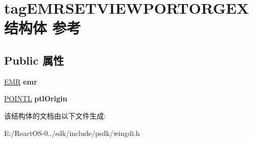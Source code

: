 \hypertarget{structtag_e_m_r_s_e_t_v_i_e_w_p_o_r_t_o_r_g_e_x}{}\section{tag\+E\+M\+R\+S\+E\+T\+V\+I\+E\+W\+P\+O\+R\+T\+O\+R\+G\+E\+X结构体 参考}
\label{structtag_e_m_r_s_e_t_v_i_e_w_p_o_r_t_o_r_g_e_x}
\subsection*{Public 属性}
\begin{DoxyCompactItemize}
\item 
\mbox{\label{structtag_e_m_r_s_e_t_v_i_e_w_p_o_r_t_o_r_g_e_x_a6c92a9b00b9b9da4b9fe07eeef8bc6f0}} 
\hyperlink{structtag_e_m_r}{E\+MR} {\bfseries emr}
\item 
\mbox{\label{structtag_e_m_r_s_e_t_v_i_e_w_p_o_r_t_o_r_g_e_x_a84aaaa2176fdb2442b5fe249a4011fe5}} 
\hyperlink{struct___p_o_i_n_t_l}{P\+O\+I\+N\+TL} {\bfseries ptl\+Origin}
\end{DoxyCompactItemize}


该结构体的文档由以下文件生成\+:\begin{DoxyCompactItemize}
\item 
E\+:/\+React\+O\+S-\/0../sdk/include/psdk/wingdi.\+h\end{DoxyCompactItemize}
